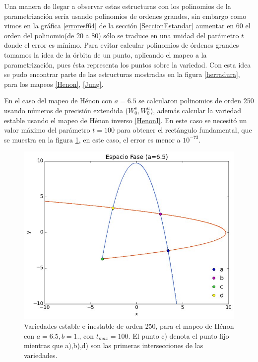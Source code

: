 Una manera de llegar a observar estas estructuras con los polinomios de la parametrización sería usando polinomios de ordenes grandes, sin embargo como vimos en la gráfica \ref{erroresf64} de la sección \ref{SeccionEstandar} aumentar en 60 el orden del polinomio(de 20 a 80) sólo se traduce en una unidad del parámetro $t$ donde el error es mínimo. Para evitar calcular polinomios de órdenes grandes tomamos la idea de la órbita de un punto, aplicando el mapeo a la parametrización, pues ésta representa los puntos sobre la variedad. Con esta idea se pudo encontrar parte de las estructuras mostradas en la figura \ref{herradura}, para los mapeos \eqref{Henon}, \eqref{Jung}.


En el caso del mapeo de Hénon con $a=6.5$ se calcularon polinomios de orden 250 usando números de precisión extendida ($W_{0}^{s},W_{0}^{u}$), además calcular la variedad estable usando el mapeo de Hénon inverso \eqref{HenonI}. En este caso se necesitó un valor máximo del parámetro $t=100$ para obtener el rectángulo fundamental, que se muestra en la figura \ref{rectangulo0}, en este caso, el error es menor a $10^{-73}$.

\begin{figure}[H]
\centering
\includegraphics[scale=0.4]{rectangulo-fundamental}
\caption{Variedades estable e inestable de orden 250, para el mapeo de Hénon con $a=6.5,b=1.$, con $t_{max}=100$. El punto c) denota el punto fijo mientras que  a),b),d) son las primeras intersecciones de las variedades.}
\label{rectangulo0}
\end{figure}

